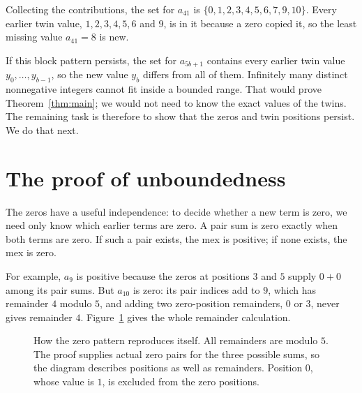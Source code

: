 \documentclass[11pt]{amsart}
\theoremstyle{remark}
\begin{document}
Collecting the contributions, the set for $a_{41}$ is $\{0,1,2,3,4,5,6,7,9,10\}$. Every earlier twin value, $1,2,3,4,5,6$ and $9$, is in it because a zero copied it, so the least missing value $a_{41}=8$ is new.

If this block pattern persists, the set for $a_{5b+1}$ contains every earlier twin value $y_0,\dots,y_{b-1}$, so the new value $y_b$ differs from all of them. Infinitely many distinct nonnegative integers cannot fit inside a bounded range. That would prove Theorem~\ref{thm:main}; we would not need to know the exact values of the twins. The remaining task is therefore to show that the zeros and twin positions persist. We do that next.

\section{The proof of unboundedness}\label{sec:proof}

The zeros have a useful independence: to decide whether a new term is zero, we need only know which earlier terms are zero. A pair sum is zero exactly when both terms are zero. If such a pair exists, the mex is positive; if none exists, the mex is zero.

For example, $a_9$ is positive because the zeros at positions $3$ and $5$ supply $0+0$ among its pair sums. But $a_{10}$ is zero: its pair indices add to $9$, which has remainder $4$ modulo $5$, and adding two zero-position remainders, $0$ or $3$, never gives remainder $4$. Figure~\ref{fig:zero-pattern} gives the whole remainder calculation.

\begin{figure}[H]
\centering
{}
\caption{How the zero pattern reproduces itself. All remainders are modulo $5$. The proof supplies actual zero pairs for the three possible sums, so the diagram describes positions as well as remainders. Position $0$, whose value is $1$, is excluded from the zero positions.}
\label{fig:zero-pattern}
\end{figure}
\end{document}
